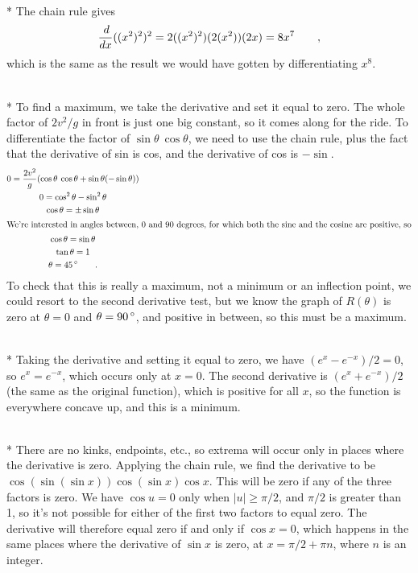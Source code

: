 \\*
The chain rule gives
\begin{equation*}
  \frac{\mathop{d\!}}{\mathop{d\!} x} ((x^2)^2)^2 = 2((x^2)^2)(2(x^2))(2x) = 8x^7 \qquad ,
\end{equation*}
which is the same as the result we would have gotten by differentiating $x^8$.

\\*
To find a maximum, we take the derivative and set it equal to zero. The whole factor
of $2v^2/g$ in front is just one big constant, so it comes along for the ride. To differentiate
the factor of $\sin\theta\:\cos\theta$, we need to use the chain rule, plus the fact that
the derivative of sin is cos, and the derivative of cos is $-\sin$.
\begin{gather*}
  0 = \frac{2v^2}{g} (\cos\theta\:\cos\theta+\sin\theta(-\sin\theta)) \\
  0 = \cos^2\theta-\sin^2\theta \\
  \cos\theta = \pm \sin\theta \\
\intertext{We're interested in angles between, 0 and 90 degrees, for which both the sine and
the cosine are positive, so}
  \cos\theta = \sin\theta \\
  \tan\theta = 1\\
  \theta = 45\,^{\circ} \qquad .
\end{gather*}
To check that this is really a maximum, not a minimum or an inflection point, we could resort
to the second derivative test, but we know the graph of $R(\theta)$ is zero at $\theta=0$
and $\theta=90\,^{\circ}$, and positive in between, so this must be a maximum.

\\*
Taking the derivative and setting it equal to zero, we have $\left(e^x-e^{-x}\right)/2=0$, so $e^x=e^{-x}$, which
occurs only at $x=0$. The second derivative is $\left(e^x+e^{-x}\right)/2$ (the same as the original function),
which is positive for all $x$, so the function is everywhere concave up, and this is a minimum.

\\*
There are no kinks, endpoints, etc., so
extrema will occur only in places where the derivative is zero.
Applying the chain rule, we find the derivative to be $\cos(\sin(\sin x))\cos(\sin x)\cos x$.
This will be zero if any of the three factors is zero. We have $\cos u=0$ only when $|u| \ge \pi/2$,
and $\pi/2$ is greater than 1, so it's not possible for either of the first two factors to equal zero.
The derivative will therefore equal zero if and only if $\cos x=0$, which happens in the same places
where the derivative of $\sin x$ is zero, at $x=\pi/2+\pi n$, where $n$ is an integer.
%

